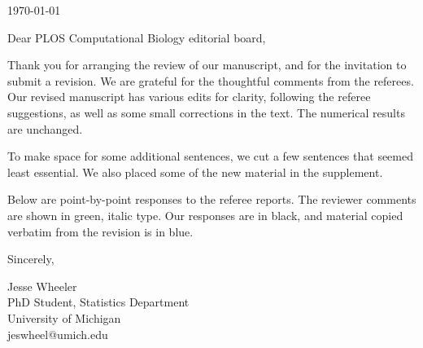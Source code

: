 \documentclass[11pt]{article}
\begin{document}
\rule{0cm}{0.3cm}

\vspace{-8mm}


\vspace{10mm}

\begin{flushright}
\today
\end{flushright}



\vspace{5mm}

Dear PLOS Computational Biology editorial board,

Thank you for arranging the review of our manuscript, and for the invitation to submit a revision.
We are grateful for the thoughtful comments from the referees.
Our revised manuscript has various edits for clarity, following the referee suggestions, as well as some small corrections in the text.
The numerical results are unchanged.

To make space for some additional sentences, we cut a few sentences that seemed least essential. We also placed some of the new material in the supplement.

Below are point-by-point responses to the referee reports.
The reviewer comments are shown in green, italic type.
Our responses are in black, and material copied verbatim from the revision is in blue.


\vspace{3mm}

Sincerely,




Jesse Wheeler \\
PhD Student, Statistics Department \\
University of Michigan\\
jeswheel@umich.edu
\end{document}
